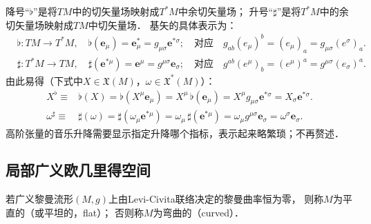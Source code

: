 降号“$\flat$”是将$TM$中的切矢量场映射成$T^*M$中余切矢量场；
升号“$\sharp$”是将$T^*M$中的余切矢量场映射成$TM$中切矢量场．
基矢的具体表示为：
\begin{align*}
	&\flat: TM \to T^*M, \quad \flat(\boldsymbol{e}_\mu) 
	= \boldsymbol{e}_\mu^{*}=g_{\mu \sigma}\boldsymbol{e}^{*\sigma} ;
	\quad \text{对应}\quad
	g_{ab} (e_\mu)^b = (e_\mu)_a =  g_{\mu \sigma} (e^\sigma)_a . \\
	&\sharp: T^*M \to TM, \quad \sharp(\boldsymbol{e}^{*\mu})  
	= \boldsymbol{e}^\mu=g^{\mu \sigma}\boldsymbol{e}_{\sigma} ;
	\quad \text{对应}\quad
	g^{ab} (e^\mu)_b  = (e^\mu)^a=  g^{\mu \sigma} (e_\sigma)^a .
\end{align*}
由此易得（下式中$X\in \mathfrak{X}(M)$，$\omega \in \mathfrak{X}^*(M)$）：
\begin{align*}
	X^{\flat} \equiv&  \flat(X) = \flat (X^\mu \boldsymbol{e}_\mu) = X^\mu \,  \flat ( \boldsymbol{e}_\mu)
	=X^\mu g_{\mu \sigma}\boldsymbol{e}^{*\sigma} = X_\sigma \boldsymbol{e}^{*\sigma}. \\
	\omega^{\sharp} \equiv& \sharp(\omega) = \sharp(\omega_\mu \boldsymbol{e}^{*\mu})
	= \omega_\mu \,  \sharp( \boldsymbol{e}^{*\mu}) = \omega_\mu g^{\mu \sigma}\boldsymbol{e}_{\sigma}
	=\omega^\sigma \boldsymbol{e}_{\sigma}.
\end{align*}
高阶张量的音乐升降需要显示指定升降哪个指标，表示起来略繁琐；不再赘述．




\subsection{局部广义欧几里得空间}\label{chrg:sec_local-EuclideanSpace}


\begin{definition}\label{chrg:def_flat-curved}
    若广义黎曼流形$(M,g)$上由Levi-Civita联络决定的黎曼曲率恒为零，
    则称$M$为{\heiti 平直的}（或平坦的，flat）；  否则称$M$为{\heiti 弯曲的}（curved）．
\end{definition}


